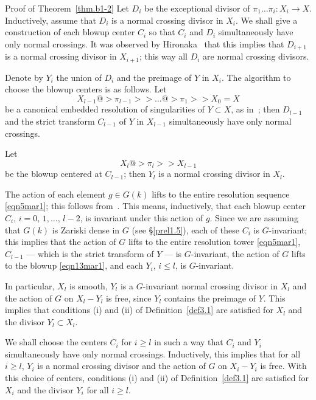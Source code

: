 \begin{pf*}{Proof of Theorem~\ref{thm.b1-2}}
Let $D_i$ be the exceptional divisor of $\pi_1\dots\pi_{i}\colon X_i\to X$.
Inductively, assume that  $D_{i}$ is a normal crossing divisor in
$X_{i}$. We shall give a construction of each blowup center $C_{i}$ so
that $C_i$ and $D_{i}$ simultaneously have only normal crossings.
It was observed by Hironaka~\cite{hironaka} that this implies that $D_{i+1}$ is
a normal crossing divisor in $X_{i+1}$; this way all $D_i$ are normal crossing
divisors.

Denote by $Y_i$ the union of $D_i$ and the preimage of $Y$ in $X_i$.
The algorithm to choose the blowup centers is as follows.  Let
\begin{equation} \label{eqn5mar1}
X_{l-1}@>\pi_{l-1}>>\dots @>\pi_1>>X_0=X
\end{equation}
be a canonical embedded resolution of singularities of $Y\subset X$, as 
in~\cite[Theorem~1.6]{bm}; then $D_{l-1}$ and the strict transform
$C_{l-1}$ of $Y$ in $X_{l-1}$ simultaneously have only normal crossings.

Let 
\begin{equation} \label{eqn13mar1}
X_l@>\pi_l>>X_{l-1}
\end{equation}
be the blowup centered at $C_{l-1}$; then $Y_l$ is a normal crossing divisor in
$X_l$.

The action of each element $g\in G(k)$ lifts to the entire resolution sequence
\eqref{eqn5mar1}; this follows from~\cite[Theorem~13.2(2)(ii)]{bm}.
This means, inductively, that each blowup center $C_i$,
$i=0,\,1,\dots,\,l-2$, is invariant under this
action of $g$. Since we are assuming that $G(k)$ is Zariski dense in $G$
(see \S\ref{prel1.5}), each of these $C_i$ is
$G$-invariant; this implies that the action of $G$ lifts to the entire
resolution tower \eqref{eqn5mar1}, $C_{l-1}$ --- which is the strict transform
of $Y$ --- is $G$-invariant, the action of $G$ lifts to the blowup
\eqref{eqn13mar1}, and each $Y_i$, $i\le l$, is $G$-invariant.

In particular, $X_l$ is smooth, $Y_l$ is a $G$-invariant normal crossing divisor
in $X_l$ and the action of $G$ on $X_l-Y_l$ is free, since $Y_l$ contains the
preimage of $Y$. This implies that conditions (i) and (ii) 
of Definition~\ref{def3.1} are satisfied for $X_l$ and
the divisor $Y_l\subset X_l$.

We shall choose the centers $C_i$ for $i\ge l$ in such a way
that $C_i$ and $Y_{i}$ simultaneously have only normal crossings.
Inductively, this implies that for all $i\ge l$, $Y_i$ is a normal
crossing divisor and the action of $G$ on $X_i-Y_i$ is free.
With this choice of centers, 
conditions (i) and (ii) of Definition~\ref{def3.1} are satisfied for $X_i$ and
the divisor $Y_i$ for all $i\ge l$.


\end{pf*}
